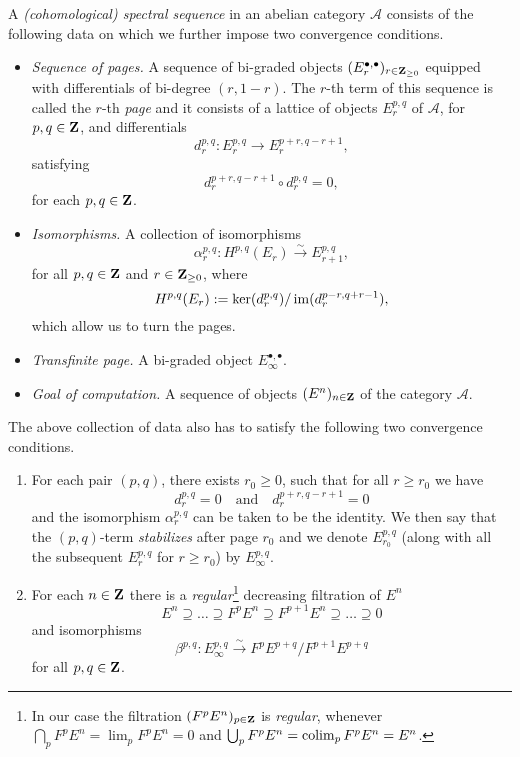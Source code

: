 \begin{definition}
    A \emph{(cohomological) spectral sequence} in an abelian category $\mathcal A$ consists of the following data on which we further impose two convergence conditions.
\begin{itemize}
    \item \emph{Sequence of pages.} 
    A sequence of bi-graded objects $(E^{\bullet, \bullet}_r)_{r \in \mathbf Z_{\geq 0}}$ equipped with differentials of bi-degree $(r, 1-r)$. The $r$-th term of this sequence is called the $r$-th \emph{page} and it consists of a lattice of objects $E^{p,q}_r$ of $\mathcal A$, for $p, q \in \mathbf Z$, and differentials
    \[
        d^{p,q}_r : E^{p,q}_r \to E^{p + r, q - r + 1}_r,
    \] 
    satisfying
    \[
        d^{p + r, q - r + 1}_r \circ d^{p,q}_r = 0,
    \]
    for each $p, q \in \mathbf Z$.
    \item \emph{Isomorphisms.} A collection of isomorphisms
    \[
        \alpha^{p,q}_r : H^{p,q}(E_r) \xrightarrow{\sim} E^{p,q}_{r + 1},
    \]
    for all $p, q \in \mathbf Z$ and $r \in \mathbf Z_{\geq 0}$, where 
    \[
        H^{p,q}(E_r) := \ker(d^{p,q}_r)/\operatorname{im}(d^{p-r, q + r - 1}_r),
    \]
    which allow us to turn the pages.
    \item \emph{Transfinite page.} A bi-graded object $E^{\bullet, \bullet}_\infty$. 
    \item \emph{Goal of computation.} A sequence of objects $(E^n)_{n \in \mathbf Z}$ of the category $\mathcal A$.
\end{itemize}
The above collection of data also has to satisfy the following two convergence conditions.
\begin{enumerate}
    \item For each pair $(p,q)$, there exists $r_0 \geq 0$, such that for all $r \geq r_0$ we have
    \[
        d^{p,q}_r = 0 \quad \text{and} \quad d^{p + r, q - r + 1}_r = 0
    \]
    and the isomorphism $\alpha^{p,q}_r$ can be taken to be the identity. We then say that the $(p,q)$-term \emph{stabilizes} after page $r_0$ and we denote $E^{p,q}_{r_0}$ (along with all the subsequent $E^{p,q}_{r}$ for $r \geq r_0$) by $E^{p,q}_\infty$.
    \item For each $n \in \mathbf Z$ there is a \emph{regular}\footnote{In our case the filtration $(F^p E^n)_{p \in \mathbf Z}$ is \emph{regular}, whenever $\bigcap_p F^p E^n = \lim_p F^p E^n = 0$ and $\bigcup_p F^p E^n = \operatorname{colim}_p F^p E^n = E^n$.} decreasing filtration of $E^n$
    \begin{equation}
        \label{eq: regular filtration}
        E^n \supseteq \dots \supseteq F^p E^n \supseteq F^{p + 1}E^n \supseteq \dots \supseteq 0
    \end{equation}
    and isomorphisms
    \[
        \beta^{p,q} : E^{p,q}_\infty \xrightarrow{\sim} F^p E^{p + q}/F^{p + 1}E^{p + q}
    \]
    for all $p, q \in \mathbf Z$.
\end{enumerate}


\end{definition}
